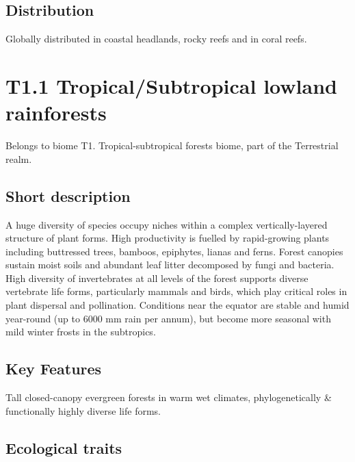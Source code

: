 \documentclass[
  letterpaper,
  DIV=11,
  numbers=noendperiod]{scrartcl}
\begin{document}
\subsection{Distribution}\label{distribution-68}

Globally distributed in coastal headlands, rocky reefs and in coral
reefs.

\section{T1.1 Tropical/Subtropical lowland
rainforests}\label{t1.1-tropicalsubtropical-lowland-rainforests}

Belongs to biome T1. Tropical-subtropical forests biome, part of the
Terrestrial realm.

\subsection{Short description}\label{short-description-69}

A huge diversity of species occupy niches within a complex
vertically-layered structure of plant forms. High productivity is
fuelled by rapid-growing plants including buttressed trees, bamboos,
epiphytes, lianas and ferns. Forest canopies sustain moist soils and
abundant leaf litter decomposed by fungi and bacteria. High diversity of
invertebrates at all levels of the forest supports diverse vertebrate
life forms, particularly mammals and birds, which play critical roles in
plant dispersal and pollination. Conditions near the equator are stable
and humid year-round (up to 6000 mm rain per annum), but become more
seasonal with mild winter frosts in the subtropics.

\subsection{Key Features}\label{key-features-69}

Tall closed-canopy evergreen forests in warm wet climates,
phylogenetically \& functionally highly diverse life forms.

\subsection{Ecological traits}\label{ecological-traits-69}
\end{document}
